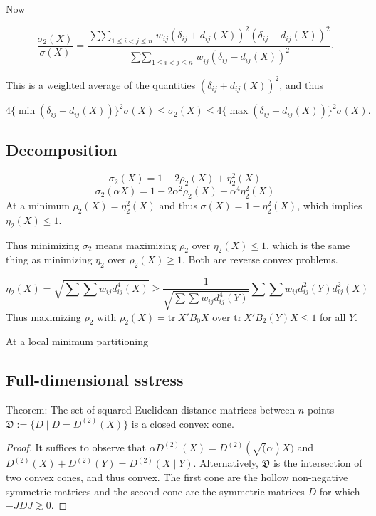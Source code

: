 \documentclass[
  12pt,
  letterpaper,
  DIV=11,
  numbers=noendperiod]{scrreprt}
\theoremstyle{remark}
\begin{document}
Now

\begin{equation}
\frac{\sigma_2(X)}{\sigma(X)}=\frac{\mathop{\sum\sum}_{1\leq i<j\leq n}w_{ij}(\delta_{ij}+d_{ij}(X))^2(\delta_{ij}-d_{ij}(X))^2}{\mathop{\sum\sum}_{1\leq i<j\leq n}w_{ij}^{\ }(\delta_{ij}-d_{ij}(X))^2}.
\end{equation}

This is a weighted average of the quantities
\((\delta_{ij}+d_{ij}(X))^2\), and thus

\begin{equation}
4\{\min(\delta_{ij}+d_{ij}(X))\}^2\sigma(X)\leq\sigma_2(X)\leq 4\{\max(\delta_{ij}+d_{ij}(X))\}^2\sigma(X).
\end{equation}

\subsection{Decomposition}\label{decomposition}

\[\sigma_2(X)=1-2\rho_2(X)+\eta_2^2(X)\]
\[\sigma_2(\alpha X)=1-2\alpha^2\rho_2(X)+\alpha^4\eta_2^2(X)\] At a
minimum \(\rho_2(X)=\eta_2^2(X)\) and thus \(\sigma(X)=1-\eta_2^2(X)\),
which implies \(\eta_2(X)\leq 1\).

Thus minimizing \(\sigma_2\) means maximizing \(\rho_2\) over
\(\eta_2(X)\leq 1\), which is the same thing as minimizing \(\eta_2\)
over \(\rho_2(X)\geq 1\). Both are reverse convex problems.

\[
\eta_2(X)=\sqrt{\sum\sum w_{ij}d_{ij}^4(X)}\geq\frac{1}{\sqrt{\sum\sum w_{ij}d_{ij}^4(Y)}}\sum\sum w_{ij}d_{ij}^2(Y)d_{ij}^2(X)
\] Thus maximizing \(\rho_2\) with \(\rho_2(X)=\text{tr}\ X'B_0X\) over
\(\text{tr}\ X'B_2(Y)X\leq 1\) for all \(Y\).

At a local minimum partitioning

\subsection{Full-dimensional sstress}\label{full-dimensional-sstress}

Theorem: The set of squared Euclidean distance matrices between \(n\)
points \(\mathfrak{D}:=\{D\mid D=D^{(2)}(X)\}\) is a closed convex cone.

\begin{proof}
It suffices to observe that
\(\alpha D^{(2)}(X)=D^{(2)}(\sqrt(\alpha)X)\) and
\(D^{(2)}(X)+D^{(2)}(Y)=D^{(2)}(X\mid Y)\). Alternatively,
\(\mathfrak{D}\) is the intersection of two convex cones, and thus
convex. The first cone are the hollow non-negative symmetric matrices
and the second cone are the symmetric matrices \(D\) for which
\(-JDJ\gtrsim 0\).
\end{proof}
\end{document}
